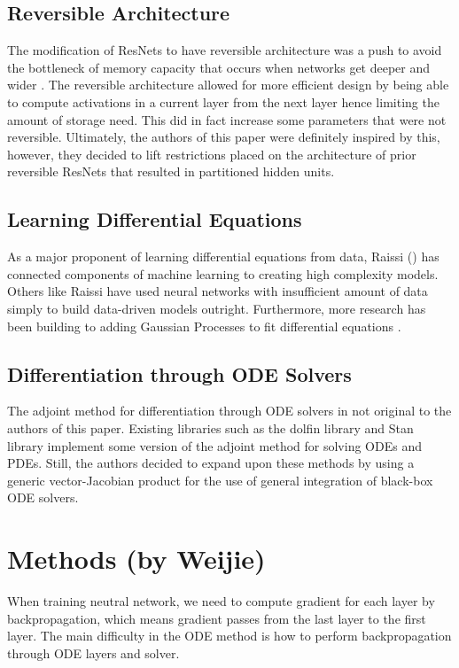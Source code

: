 \documentclass{article}
\begin{document}
\subsection{Reversible Architecture}
The modification of ResNets to have reversible architecture was a push to  avoid the bottleneck of memory capacity that occurs when networks get deeper and wider \cite{gomez2017reversible,ruthotto2018deep,chang2017multi}. The reversible architecture allowed for more efficient design by being able to compute activations in a current layer from the next layer hence limiting the amount of storage need. This did in fact increase some parameters that were not reversible. Ultimately, the authors of this paper were definitely inspired by this, however, they decided to lift restrictions placed on the architecture of prior reversible ResNets that resulted in partitioned hidden units.
\subsection{Learning Differential Equations }
As a major proponent of learning differential equations from data, Raissi (\citeyear{raissi2018multistep}) has connected components of machine learning to creating high complexity models. Others like Raissi
\cite{long2017pde} have used neural networks  with insufficient amount of data simply to build data-driven models outright. Furthermore, more research has been building to adding  Gaussian Processes to fit differential equations \cite{raissi2018multistep}.
\subsection{Differentiation through ODE Solvers}
The adjoint method for differentiation through ODE solvers in not original to the authors of this paper. Existing libraries such as the dolfin library \cite{farrell2013automated} and Stan library \cite{carpenter2015stan} implement some version of the adjoint method for solving ODEs and PDEs. Still, the authors decided to expand upon these methods by using a generic vector-Jacobian product for the use of general integration of black-box ODE solvers. 


\section{Methods (by Weijie)}
\label{sec:methods}
When training neutral network, we need to compute gradient for each layer by backpropagation, which means gradient passes from the last layer to the first layer. 
The main difficulty in the ODE method is how to perform backpropagation through ODE layers and solver. 
\end{document}
